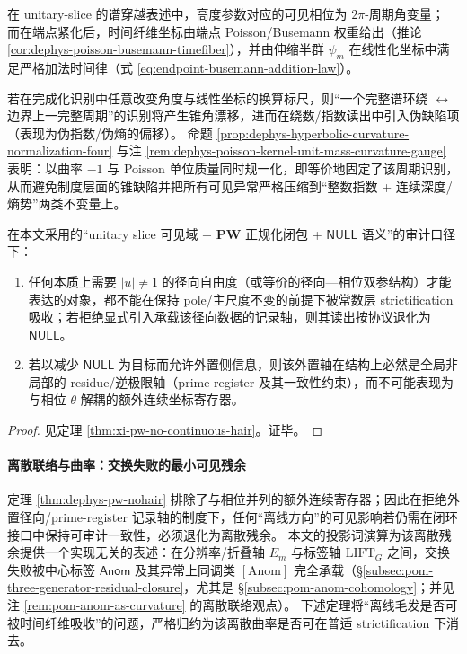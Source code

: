 \begin{remark}\label{rem:dephys-horizon-regularity-no-cone-defect}
在 unitary-slice 的谱穿越表述中，高度参数对应的可见相位为 \(2\pi\)-周期角变量；
而在端点紧化后，时间纤维坐标由端点 Poisson/Busemann 权重给出（推论 \ref{cor:dephys-poisson-busemann-timefiber}），并由伸缩半群 \(\psi_m\) 在线性化坐标中满足严格加法时间律（式 \eqref{eq:endpoint-busemann-addition-law}）。
\par
若在完成化识别中任意改变角度与线性坐标的换算标尺，则“一个完整谱环绕 \(\leftrightarrow\) 边界上一完整周期”的识别将产生锥角漂移，进而在绕数/指数读出中引入伪缺陷项（表现为伪指数/伪熵的偏移）。
命题 \ref{prop:dephys-hyperbolic-curvature-normalization-four} 与注 \ref{rem:dephys-poisson-kernel-unit-mass-curvature-gauge} 表明：以曲率 \(-1\) 与 Poisson 单位质量同时规一化，即等价地固定了该周期识别，从而避免制度层面的锥缺陷并把所有可见异常严格压缩到“整数指数 + 连续深度/熵势”两类不变量上。
\end{remark}

\begin{theorem}\label{thm:dephys-pw-nohair}
在本文采用的“unitary slice 可见域 + \(\mathbf{PW}\) 正规化闭包 + \(\mathsf{NULL}\) 语义”的审计口径下：
\begin{enumerate}
  \item 任何本质上需要 \(|u|\neq 1\) 的径向自由度（或等价的径向—相位双参结构）才能表达的对象，都不能在保持 pole/主尺度不变的前提下被常数层 strictification 吸收；若拒绝显式引入承载该径向数据的记录轴，则其读出按协议退化为 \(\mathsf{NULL}\)。
  \item 若以减少 \(\mathsf{NULL}\) 为目标而允许外置侧信息，则该外置轴在结构上必然是全局非局部的 residue/逆极限轴（prime-register 及其一致性约束），而不可能表现为与相位 \(\theta\) 解耦的额外连续坐标寄存器。
\end{enumerate}
\end{theorem}

\begin{proof}
见定理 \ref{thm:xi-pw-no-continuous-hair}。证毕。
\end{proof}



\paragraph{离散联络与曲率：交换失败的最小可见残余}
定理 \ref{thm:dephys-pw-nohair} 排除了与相位并列的额外连续寄存器；因此在拒绝外置径向/prime-register 记录轴的制度下，任何“离线方向”的可见影响若仍需在闭环接口中保持可审计一致性，必须退化为离散残余。
本文的投影词演算为该离散残余提供一个实现无关的表述：在分辨率/折叠轴 \(E_m\) 与标签轴 \(\mathrm{LIFT}_G\) 之间，交换失败被中心标签 \(\mathsf{Anom}\) 及其异常上同调类 \([\mathrm{Anom}]\) 完全承载（\S\ref{subsec:pom-three-generator-residual-closure}，尤其是 \S\ref{subsec:pom-anom-cohomology}；并见注 \ref{rem:pom-anom-as-curvature} 的离散联络观点）。
下述定理将“离线毛发是否可被时间纤维吸收”的问题，严格归约为该离散曲率是否可在普适 strictification 下消去。

